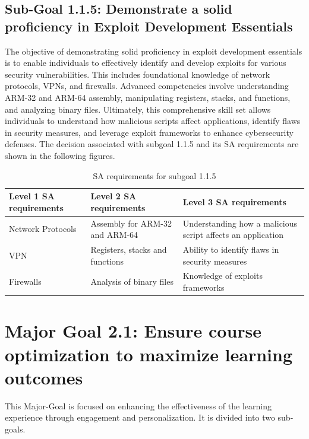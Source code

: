 \newpage
\subsection{Sub-Goal 1.1.5: Demonstrate a solid proficiency in Exploit Development Essentials}
The objective of demonstrating solid proficiency in exploit development essentials is to enable individuals to effectively identify and develop exploits for various security vulnerabilities. This includes foundational knowledge of network protocols, VPNs, and firewalls. Advanced competencies involve understanding ARM-32 and ARM-64 assembly, manipulating registers, stacks, and functions, and analyzing binary files. Ultimately, this comprehensive skill set allows individuals to understand how malicious scripts affect applications, identify flaws in security measures, and leverage exploit frameworks to enhance cybersecurity defenses.
The decision associated with subgoal 1.1.5 and its SA requirements are shown in the following figures.

\begin{table}[H]
    \begin{center}
    \begin{tabular}{ | m{5cm} | m{5cm}| m{5cm} | } 
      \hline
      \textbf{Level 1 SA requirements} & \textbf{Level 2 SA requirements}  & \textbf{Level 3 SA requirements}  \\ 
      \hline
      Network Protocols & Assembly for ARM-32 and ARM-64 & Understanding how a malicious script affects an application\\ 
      \hline
      VPN &  Registers, stacks and functions & Ability to identify flaws in security measures\\ 
      \hline
      Firewalls & Analysis of binary files & Knowledge of exploits frameworks\\  
      \hline
    \end{tabular}
    \end{center}
    \caption{SA requirements for subgoal 1.1.5}
    \end{table}

\newpage
\section{Major Goal 2.1: Ensure course optimization to maximize learning outcomes}
This Major-Goal is focused on enhancing the effectiveness of the learning experience through engagement and personalization. It is divided into two sub-goals.

